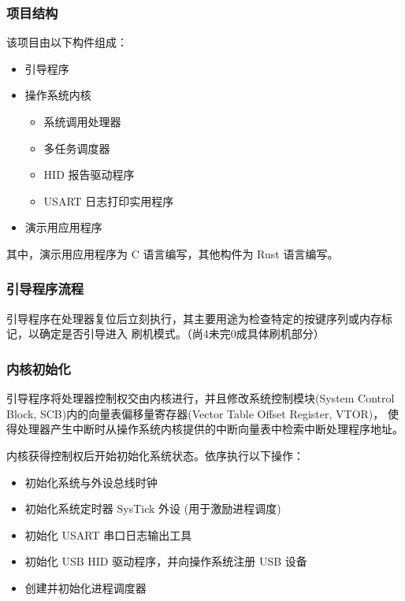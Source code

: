 \documentclass[aspectratio=169]{beamer}
\begin{document}
\begin{frame}
    \frametitle{项目结构}
    
    该项目由以下构件组成：

    \begin{itemize}
        \item 引导程序
        \item 操作系统内核
        \begin{itemize}
            \item 系统调用处理器
            \item 多任务调度器
            \item HID 报告驱动程序
            \item USART 日志打印实用程序
        \end{itemize}
        \item 演示用应用程序
    \end{itemize}

    其中，演示用应用程序为 C 语言编写，其他构件为 Rust 语言编写。
\end{frame}

\begin{frame}
    \frametitle{引导程序流程}

    引导程序在处理器复位后立刻执行，其主要用途为检查特定的按键序列或内存标记，以确定是否引导进入
    刷机模式。（尚4未完0成具体刷机部分）
    
    \vspace{1em}

\end{frame}

\begin{frame}
    \frametitle{内核初始化}

    引导程序将处理器控制权交由内核进行，并且修改系统控制模块(System Control Block, SCB)内的向量表偏移量寄存器(Vector Table Offset Register, VTOR)，
    使得处理器产生中断时从操作系统内核提供的中断向量表中检索中断处理程序地址。
    \par
    内核获得控制权后开始初始化系统状态。依序执行以下操作：
    \begin{itemize}
        \item 初始化系统与外设总线时钟
        \item 初始化系统定时器 SysTick 外设 (用于激励进程调度)
        \item 初始化 USART 串口日志输出工具
        \item 初始化 USB HID 驱动程序，并向操作系统注册 USB 设备
        \item 创建并初始化进程调度器
    \end{itemize}
\end{frame}
\end{document}

